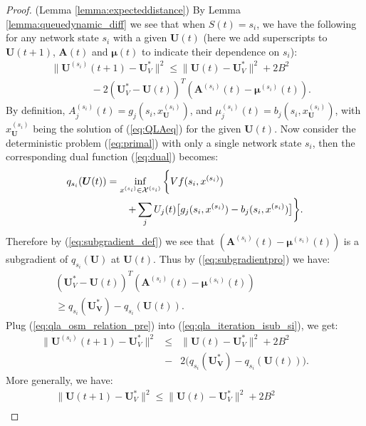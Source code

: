 \documentclass[journal]{IEEEtran}
\newcommand{\bv}[1]{{\boldsymbol{#1} }}
\newcommand{\script}[1]{{{\cal{#1} }}}
\begin{document}
\begin{proof} (Lemma \ref{lemma:expecteddistance})
By Lemma \ref{lemma:queuedynamic_diff} we see that when $S(t)=s_i$, we have the following for any network state $s_i$ with a given $\bv{U}(t)$ (here we add superscripts to $\bv{U}(t+1)$, $\bv{A}(t)$ and $\bv{\mu}(t)$ to indicate their dependence on $s_i$):
\begin{eqnarray}
\|\bv{U}^{(s_i)}(t+1)-\bv{U}_V^*\|^2\leq \|\bv{U}(t)-\bv{U}_V^*\|^2+2B^2\qquad\quad\label{eq:qla_iteration_isub_si}\\
\qquad\qquad-2(\bv{U}_V^*-\bv{U}(t))^{T}(\bv{A}^{(s_i)}(t)-\bv{\mu}^{(s_i)}(t)).\nonumber
\end{eqnarray}
By definition, $A^{(s_i)}_j(t)=g_j(s_i, x^{(s_i)}_{\bv{U}})$, and $\mu^{(s_i)}_j(t)=b_j(s_i, x^{(s_i)}_{\bv{U}})$, with $x^{(s_i)}_{\bv{U}}$ being the solution of (\ref{eq:QLAeq}) for the given $\bv{U}(t)$. Now  consider the deterministic problem (\ref{eq:primal}) with only a single network state $s_i$, then the corresponding dual function (\ref{eq:dual}) becomes:
\begin{eqnarray}
q_{s_i}(\bv{U}(t))=\inf_{x^{(s_i)}\in\script{X}^{(s_i)}}\bigg\{Vf(s_i, x^{(s_i)})\label{eq:dual_singlestate}\qquad\qquad\qquad\qquad\\
+\sum_jU_j(t)\big[g_j(s_i, x^{(s_i)})-b_j(s_i, x^{(s_i)})\big]\bigg\}.\nonumber
\end{eqnarray}
Therefore by (\ref{eq:subgradient_def}) we see that $(\bv{A}^{(s_i)}(t)-\bv{\mu}^{(s_i)}(t))$ is a subgradient of $q_{s_i}(\bv{U})$ at $\bv{U}(t)$. Thus by (\ref{eq:subgradientpro}) we have:
\begin{eqnarray}
(\bv{U}_V^*-\bv{U}(t))^{T}(\bv{A}^{(s_i)}(t)-\bv{\mu}^{(s_i)}(t))\label{eq:qla_osm_relation_pre}\qquad\qquad\qquad\\
\geq q_{s_i}(\bv{U^*_V})-q_{s_i}(\bv{U}(t)).\nonumber
\end{eqnarray}
Plug (\ref{eq:qla_osm_relation_pre}) into (\ref{eq:qla_iteration_isub_si}), we get:
\begin{eqnarray}
\|\bv{U}^{(s_i)}(t+1)-\bv{U}_V^*\|^2&\leq& \|\bv{U}(t)-\bv{U}_V^*\|^2+2B^2\label{eq:qla_iteration_dist}\qquad\qquad\\
\qquad&-&2\big(q_{s_i}(\bv{U^*_V})-q_{s_i}(\bv{U}(t))\big).\nonumber
\end{eqnarray}
More generally, we have:
\begin{eqnarray}
\|\bv{U}(t+1)-\bv{U}^*_V\|^2 \leq \|\bv{U}(t)-\bv{U}^*_V\|^2 + 2B^2\label{eq:qla_iteration_general}\qquad\qquad \\

\end{eqnarray}
\end{proof}
\end{document}
